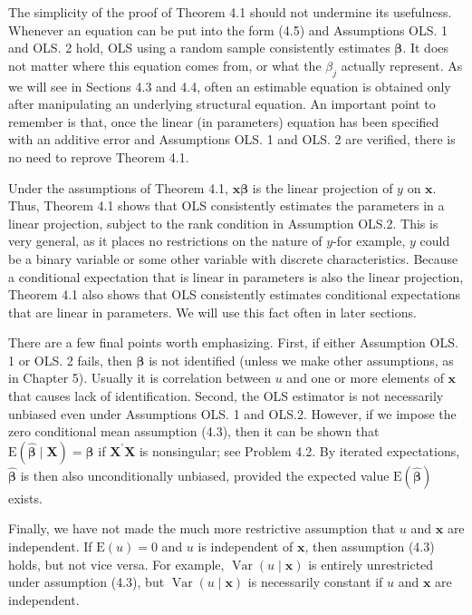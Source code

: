 \documentclass[10pt]{article}
\begin{document}
The simplicity of the proof of Theorem 4.1 should not undermine its usefulness. Whenever an equation can be put into the form (4.5) and Assumptions OLS. 1 and OLS. 2 hold, OLS using a random sample consistently estimates $\boldsymbol{\beta}$. It does not matter where this equation comes from, or what the $\beta_{j}$ actually represent. As we will see in Sections 4.3 and 4.4, often an estimable equation is obtained only after manipulating an underlying structural equation. An important point to remember is that, once the linear (in parameters) equation has been specified with an additive error and Assumptions OLS. 1 and OLS. 2 are verified, there is no need to reprove Theorem 4.1.

Under the assumptions of Theorem 4.1, $\mathbf{x} \boldsymbol{\beta}$ is the linear projection of $y$ on $\mathbf{x}$. Thus, Theorem 4.1 shows that OLS consistently estimates the parameters in a linear projection, subject to the rank condition in Assumption OLS.2. This is very general, as it places no restrictions on the nature of $y$-for example, $y$ could be a binary variable or some other variable with discrete characteristics. Because a conditional expectation that is linear in parameters is also the linear projection, Theorem 4.1 also shows that OLS consistently estimates conditional expectations that are linear in parameters. We will use this fact often in later sections.

There are a few final points worth emphasizing. First, if either Assumption OLS. 1 or OLS. 2 fails, then $\boldsymbol{\beta}$ is not identified (unless we make other assumptions, as in Chapter 5). Usually it is correlation between $u$ and one or more elements of $\mathbf{x}$ that causes lack of identification. Second, the OLS estimator is not necessarily unbiased even under Assumptions OLS. 1 and OLS.2. However, if we impose the zero conditional mean assumption (4.3), then it can be shown that $\mathrm{E}(\hat{\boldsymbol{\beta}} \mid \mathbf{X})=\boldsymbol{\beta}$ if $\mathbf{X}^{\prime} \mathbf{X}$ is nonsingular; see Problem 4.2. By iterated expectations, $\hat{\boldsymbol{\beta}}$ is then also unconditionally unbiased, provided the expected value $\mathrm{E}(\hat{\boldsymbol{\beta}})$ exists.

Finally, we have not made the much more restrictive assumption that $u$ and $\mathbf{x}$ are independent. If $\mathrm{E}(u)=0$ and $u$ is independent of $\mathbf{x}$, then assumption (4.3) holds, but not vice versa. For example, $\operatorname{Var}(u \mid \mathbf{x})$ is entirely unrestricted under assumption (4.3), but $\operatorname{Var}(u \mid \mathbf{x})$ is necessarily constant if $u$ and $\mathbf{x}$ are independent.
\end{document}
